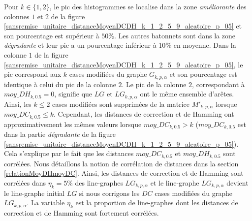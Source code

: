 Pour $k \in \{1,2\}$, le pic des histogrammes se localise dans la zone {\em am\'eliorante} des colonnes $1$ et $2$ de la figure \ref{sansremise_unitaire_distanceMoyenDCDH_k_1_2_5_9_aleatoire_p_05} et son pourcentage est sup\'erieur \`a $50\%$. 
Les autres batonnets sont dans la zone {\em d\'egradante} et leur pic a un pourcentage inf\'erieur \`a $10\%$ en moyenne. 
Dans la colonne $1$ de la figure \ref{sansremise_unitaire_distanceMoyenDCDH_k_1_2_5_9_aleatoire_p_05}, le pic correspond aux $k$ cases modifi\'ees du graphe $G_{k,p,\alpha}$ et son pourcentage est identique \`a celui du pic de la colonne $2$. 
Le pic de la colonne $2$, correspondant \`a $moy\_DH_{k,0.5} = 0$, signifie que  $LG$ et $LG_{k,p,\alpha}$ ont le m\^eme ensemble d'ar\^etes. Ainsi, les $k \le 2$ cases modifi\'ees sont supprim\'ees de la matrice $M'_{k,p,\alpha}$ lorsque $moy\_DC_{k,0.5} \le k$.
Cependant, les distances de correction et de Hamming ont approximativement les m\^emes valeurs lorsque $moy\_DC_{k,0.5} > k$ ($moy\_DC_{k,0.5}$ est dans la partie {\em d\'egradante} de la figure \ref{sansremise_unitaire_distanceMoyenDCDH_k_1_2_5_9_aleatoire_p_05}). 
Cela s'explique par le fait que les distances $moy\_DC_{k,0.5}$ et $moy\_DH_{k,0.5}$ sont corr\'el\'ees. Nous d\'etaillons la notion de corr\'elation de distances dans la section \ref{relationMoyDHmoyDC}.
Ainsi, les distances de correction et de Hamming sont corr\'el\'ees dans $\eta_k = 5\%$ des line-graphes $LG_{k,p,\alpha}$ et le line-graphe $LG_{k,p,\alpha}$ devient le line-graphe initial $LG$ si nous corrigons les $DC$ cases modifi\'ees du graphe $LG_{k,p,\alpha}$. 
La variable $\eta_k$ est la proportion de line-graphes dont les distances de correction et de Hamming sont fortement corr\'el\'ees.
\newline

